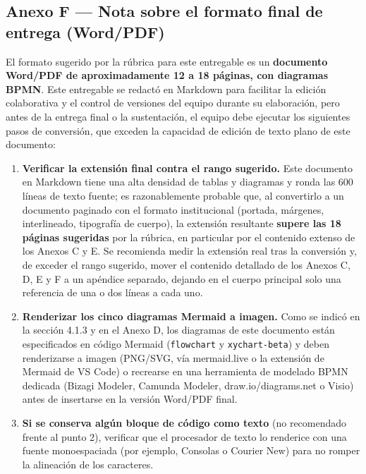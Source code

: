 \documentclass[11pt,a4paper]{article}
\providecommand{\tightlist}{%
  \setlength{\itemsep}{0pt}\setlength{\parskip}{0pt}}
\begin{document}
\subsection{Anexo F --- Nota sobre el formato final de entrega (Word/PDF)}\label{anexo-f-nota-sobre-el-formato-final-de-entrega-wordpdf}

El formato sugerido por la rúbrica para este entregable es un \textbf{documento Word/PDF de aproximadamente 12 a 18 páginas, con diagramas BPMN}. Este entregable se redactó en Markdown para facilitar la edición colaborativa y el control de versiones del equipo durante su elaboración, pero antes de la entrega final o la sustentación, el equipo debe ejecutar los siguientes pasos de conversión, que exceden la capacidad de edición de texto plano de este documento:

\begin{enumerate}
\def\labelenumi{\arabic{enumi}.}
\tightlist
\item
  \textbf{Verificar la extensión final contra el rango sugerido.} Este documento en Markdown tiene una alta densidad de tablas y diagramas y ronda las 600 líneas de texto fuente; es razonablemente probable que, al convertirlo a un documento paginado con el formato institucional (portada, márgenes, interlineado, tipografía de cuerpo), la extensión resultante \textbf{supere las 18 páginas sugeridas} por la rúbrica, en particular por el contenido extenso de los Anexos C y E. Se recomienda medir la extensión real tras la conversión y, de exceder el rango sugerido, mover el contenido detallado de los Anexos C, D, E y F a un apéndice separado, dejando en el cuerpo principal solo una referencia de una o dos líneas a cada uno.
\item
  \textbf{Renderizar los cinco diagramas Mermaid a imagen.} Como se indicó en la sección 4.1.3 y en el Anexo D, los diagramas de este documento están especificados en código Mermaid (\texttt{flowchart} y \texttt{xychart-beta}) y deben renderizarse a imagen (PNG/SVG, vía mermaid.live o la extensión de Mermaid de VS Code) o recrearse en una herramienta de modelado BPMN dedicada (Bizagi Modeler, Camunda Modeler, draw.io/diagrams.net o Visio) antes de insertarse en la versión Word/PDF final.
\item
  \textbf{Si se conserva algún bloque de código como texto} (no recomendado frente al punto 2), verificar que el procesador de texto lo renderice con una fuente monoespaciada (por ejemplo, Consolas o Courier New) para no romper la alineación de los caracteres.
\end{enumerate}
\end{document}
